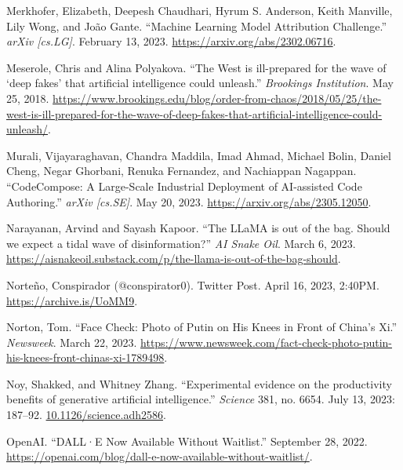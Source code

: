 \documentclass{article}
\begin{document}
\begin{thebibliography}{9}
  Merkhofer, Elizabeth, Deepesh Chaudhari, Hyrum S. Anderson, Keith Manville, Lily Wong, and João Gante. ``Machine Learning Model Attribution Challenge.'' \textit{arXiv [cs.LG]}. February 13, 2023. \href{https://arxiv.org/abs/2302.06716}{https://arxiv.org/abs/2302.06716}. 

  Meserole, Chris and Alina Polyakova. ``The West is ill-prepared for the wave of `deep fakes' that artificial intelligence could unleash.'' \textit{Brookings Institution}. May 25, 2018. \href{https://www.brookings.edu/blog/order-from-chaos/2018/05/25/the-west-is-ill-prepared-for-the-wave-of-deep-fakes-that-artificial-intelligence-could-unleash/}{https://www.brookings.edu/blog/order-from-chaos/2018/05/25/the-west-is-ill-prepared-for-the-wave-of-deep-fakes-that-artificial-intelligence-could-unleash/}. 

  Murali, Vijayaraghavan, Chandra Maddila, Imad Ahmad, Michael Bolin, Daniel Cheng, Negar Ghorbani, Renuka Fernandez, and Nachiappan Nagappan. ``CodeCompose: A Large-Scale Industrial Deployment of AI-assisted Code Authoring.'' \textit{arXiv [cs.SE]}. May 20, 2023. \href{https://arxiv.org/abs/2305.12050}{https://arxiv.org/abs/2305.12050}. 

  Narayanan, Arvind and Sayash Kapoor. ``The LLaMA is out of the bag. Should we expect a tidal wave of disinformation?'' \textit{AI Snake Oil}. March 6, 2023. \href{https://aisnakeoil.substack.com/p/the-llama-is-out-of-the-bag-should}{https://aisnakeoil.substack.com/p/the-llama-is-out-of-the-bag-should}.

  Norteño, Conspirador (@conspirator0). Twitter Post. April 16, 2023, 2:40PM. \href{https://archive.is/UoMM9}{https://archive.is/UoMM9}. 

  Norton, Tom. ``Face Check: Photo of Putin on His Knees in Front of China's Xi.'' \textit{Newsweek}. March 22, 2023. \href{https://www.newsweek.com/fact-check-photo-putin-his-knees-front-chinas-xi-1789498}{https://www.newsweek.com/fact-check-photo-putin-his-knees-front-chinas-xi-1789498}.
  
  Noy, Shakked, and Whitney Zhang. ``Experimental evidence on the productivity benefits of generative artificial intelligence.'' \textit{Science} 381, no. 6654. July 13, 2023: 187–92. \href{https://www.science.org/doi/10.1126/science.adh2586}{10.1126/science.adh2586}.

  OpenAI. ``DALL·E Now Available Without Waitlist.'' September 28, 2022. \href{https://openai.com/blog/dall-e-now-available-without-waitlist/}{https://openai.com/blog/dall-e-now-available-without-waitlist/}.


\end{thebibliography}
\end{document}
